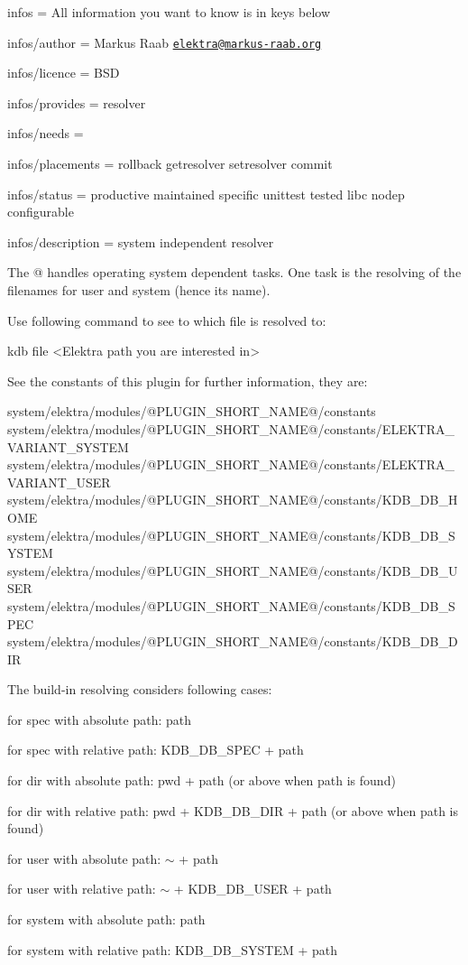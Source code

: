 
\begin{DoxyItemize}
\item infos = All information you want to know is in keys below
\item infos/author = Markus Raab \href{mailto:elektra@markus-raab.org}{\tt elektra@markus-\/raab.\+org}
\item infos/licence = B\+S\+D
\item infos/provides = resolver
\item infos/needs =
\item infos/placements = rollback getresolver setresolver commit
\item infos/status = productive maintained specific unittest tested libc nodep configurable
\item infos/description = system independent resolver
\end{DoxyItemize}

The @ handles operating system dependent tasks. One task is the resolving of the filenames for user and system (hence its name).

Use following command to see to which file is resolved to\+: \begin{DoxyVerb}kdb file <Elektra path you are interested in>
\end{DoxyVerb}


See the constants of this plugin for further information, they are\+: \begin{DoxyVerb}system/elektra/modules/@PLUGIN_SHORT_NAME@/constants
system/elektra/modules/@PLUGIN_SHORT_NAME@/constants/ELEKTRA_VARIANT_SYSTEM
system/elektra/modules/@PLUGIN_SHORT_NAME@/constants/ELEKTRA_VARIANT_USER
system/elektra/modules/@PLUGIN_SHORT_NAME@/constants/KDB_DB_HOME
system/elektra/modules/@PLUGIN_SHORT_NAME@/constants/KDB_DB_SYSTEM
system/elektra/modules/@PLUGIN_SHORT_NAME@/constants/KDB_DB_USER
system/elektra/modules/@PLUGIN_SHORT_NAME@/constants/KDB_DB_SPEC
system/elektra/modules/@PLUGIN_SHORT_NAME@/constants/KDB_DB_DIR
\end{DoxyVerb}


The build-\/in resolving considers following cases\+:


\begin{DoxyItemize}
\item for spec with absolute path\+: path
\item for spec with relative path\+: K\+D\+B\+\_\+\+D\+B\+\_\+\+S\+P\+E\+C + path
\item for dir with absolute path\+: {\ttfamily pwd} + path (or above when path is found)
\item for dir with relative path\+: {\ttfamily pwd} + K\+D\+B\+\_\+\+D\+B\+\_\+\+D\+I\+R + path (or above when path is found)
\item for user with absolute path\+: $\sim$ + path
\item for user with relative path\+: $\sim$ + K\+D\+B\+\_\+\+D\+B\+\_\+\+U\+S\+E\+R + path
\item for system with absolute path\+: path
\item for system with relative path\+: K\+D\+B\+\_\+\+D\+B\+\_\+\+S\+Y\+S\+T\+E\+M + path
\end{DoxyItemize}


